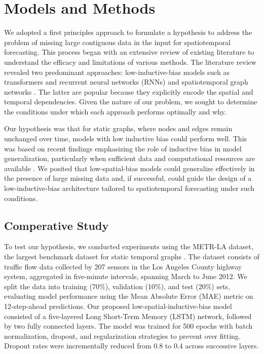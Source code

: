 \documentclass{article}
\theoremstyle{plain}
\theoremstyle{definition}
\theoremstyle{remark}
\begin{document}
\section{Models and Methods}

We adopted a first principles approach to formulate a hypothesis to address the problem of missing large contiguous data in the input for spatiotemporal forecasting. This process began with an extensive review of existing literature to understand the efficacy and limitations of various methods. The literature review revealed two predominant approaches: low-inductive-bias models such as transformers and recurrent neural networks (RNNs) and spatiotemporal graph networks \cite{longa2023graph}. The latter are popular because they explicitly encode the spatial and temporal dependencies. Given the nature of our problem, we sought to determine the conditions under which each approach performs optimally and why.

Our hypothesis was that for static graphs, where nodes and edges remain unchanged over time, models with low inductive bias could perform well. This was based on recent findings emphasizing the role of inductive bias in model generalization, particularly when sufficient data and computational resources are available \cite{bachmann2024scaling}. We posited that low-spatial-bias models could generalize effectively in the presence of large missing data and, if successful, could guide the design of a low-inductive-bias architecture tailored to spatiotemporal forecasting under such conditions.

\subsection{Comperative Study}
To test our hypothesis, we conducted experiments using the METR-LA dataset, the largest benchmark dataset for static temporal graphs \cite{li2017diffusion}. The dataset consists of traffic flow data collected by 207 sensors in the Los Angeles County highway system, aggregated in five-minute intervals, spanning March to June 2012. We split the data into training (70\%), validation (10\%), and test (20\%) sets, evaluating model performance using the Mean Absolute Error (MAE) metric on 12-step-ahead predictions. Our proposed low-spatial-inductive-bias model consisted of a five-layered Long Short-Term Memory (LSTM) network, followed by two fully connected layers. The model was trained for 500 epochs with batch normalization, dropout, and regularization strategies to prevent over fitting. Dropout rates were incrementally reduced from 0.8 to 0.4 across successive layers.
\end{document}
